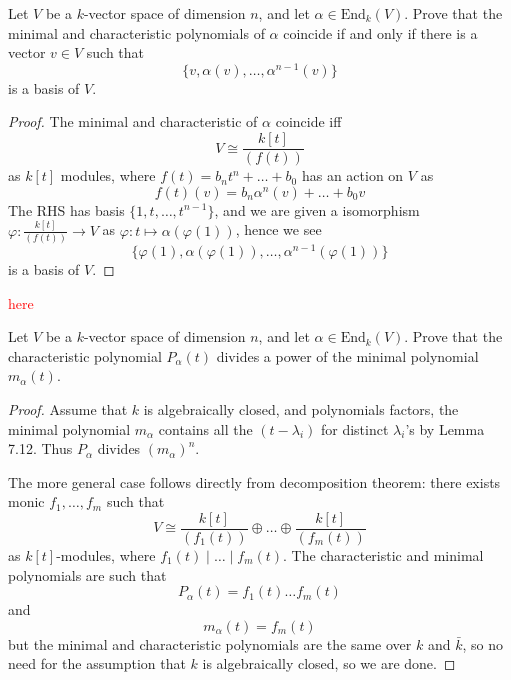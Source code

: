 \documentclass[openany]{book}
\begin{document}
\begin{prob}[7.7]
    Let \( V \) be a \( k \)-vector space of dimension \( n \), and let \( \alpha \in \text{End}_k(V) \). Prove that the minimal and characteristic polynomials of \( \alpha \) coincide if and only if there is a vector \( v \in V \) such that  
    \[ \{v, \alpha(v), \dots, \alpha^{n-1}(v)\} \] 
is a basis of \( V \).
\end{prob}
\begin{proof}
    The minimal and characteristic of $\alpha$ coincide iff 
    \begin{equation*}
        V\cong\frac{k[t]}{(f(t))}
    \end{equation*}
    as $k[t]$ modules, where $f(t)=b_nt^n+\dots+b_0$ has an action on $V$ as
    \begin{equation*}
        f(t)(v)=b_n\alpha^n(v)+\dots+b_0v
    \end{equation*} 
    The RHS has basis $\{1,t,\dots, t^{n-1}\}$,  and we are given a isomorphism $\varphi: \frac{k[t]}{(f(t))}\to V$ as  $\varphi: t\mapsto\alpha(\varphi(1))$, hence we see 
    \begin{equation*}
        \{\varphi(1),\alpha(\varphi(1)),\dots, \alpha^{n-1}(\varphi(1))\}
    \end{equation*}
    is a basis of $V$. 
\end{proof}

\textcolor{red}{here}



\begin{prob}[7.8]
    Let \( V \) be a \( k \)-vector space of dimension \( n \), and let \( \alpha \in \text{End}_k(V) \). Prove that the characteristic polynomial \( P_\alpha(t) \) divides a power of the minimal polynomial \( m_\alpha(t) \).
\end{prob}
\begin{proof}
    Assume that $k$ is algebraically closed, and polynomials factors, the minimal polynomial $m_\alpha$ contains all the $(t-\lambda_i)$ for distinct $\lambda_i$'s by Lemma 7.12. Thus $P_\alpha$ divides $(m_\alpha)^n$.

    The more general case follows directly from decomposition theorem: there exists monic $f_1,\dots, f_m$ such that 
    \begin{equation*}
        V\cong\frac{k[t]}{(f_1(t))}\oplus\dots\oplus\frac{k[t]}{(f_m(t))}
    \end{equation*}
    as $k[t]$-modules, where $f_1(t)\mid\dots\mid f_m(t)$. The characteristic and minimal polynomials are such that 
    \begin{equation*}
        P_\alpha(t)=f_1(t)\dots f_m(t)
    \end{equation*}
    and 
    \begin{equation*}
        m_\alpha(t)=f_m(t)
    \end{equation*}
    but the minimal and characteristic polynomials are the same over $k$ and $\bar{k}$, so no need for the assumption that $k$ is algebraically closed, so we are done.
\end{proof}
\end{document}
